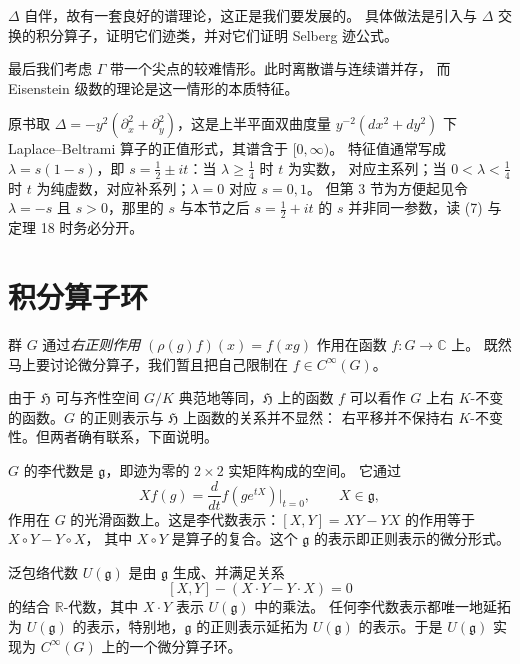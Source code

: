 $\Delta$ 自伴，故有一套良好的谱理论，这正是我们要发展的。
具体做法是引入与 $\Delta$ 交换的积分算子，证明它们迹类，并对它们证明 Selberg 迹公式。

最后我们考虑 $\Gamma$ 带一个尖点的较难情形。此时离散谱与连续谱并存，
而 Eisenstein 级数的理论是这一情形的本质特征。

\begin{annote}
原书取 $\Delta=-y^{2}(\partial_{x}^{2}+\partial_{y}^{2})$，这是上半平面双曲度量
$y^{-2}(dx^{2}+dy^{2})$ 下 Laplace--Beltrami 算子的正值形式，其谱含于 $[0,\infty)$。
特征值通常写成 $\lambda=s(1-s)$，即 $s=\tfrac12\pm it$：当 $\lambda\ge\tfrac14$ 时 $t$ 为实数，
对应主系列；当 $0<\lambda<\tfrac14$ 时 $t$ 为纯虚数，对应补系列；$\lambda=0$ 对应 $s=0,1$。
但第 3 节为方便起见令 $\lambda=-s$ 且 $s>0$，那里的 $s$ 与本节之后 $s=\tfrac12+it$ 的 $s$
并非同一参数，读 (7) 与定理 18 时务必分开。
\par{}
\end{annote}

\section{积分算子环}

群 $G$ 通过\emph{右正则作用} $(\rho(g)f)(x)=f(xg)$ 作用在函数 $f:G\to\mathbb{C}$ 上。
既然马上要讨论微分算子，我们暂且把自己限制在 $f\in C^{\infty}(G)$。

由于 $\mathfrak{H}$ 可与齐性空间 $G/K$ 典范地等同，$\mathfrak{H}$ 上的函数 $f$ 可以看作 $G$
上右 $K$-不变的函数。$G$ 的正则表示与 $\mathfrak{H}$ 上函数的关系并不显然：
右平移并不保持右 $K$-不变性。但两者确有联系，下面说明。

$G$ 的李代数是 $\mathfrak{g}$，即迹为零的 $2\times2$ 实矩阵构成的空间。
它通过
\[
Xf(g)=\frac{d}{dt}f(ge^{tX})\Big|_{t=0},\qquad X\in\mathfrak{g},
\]
作用在 $G$ 的光滑函数上。这是李代数表示：$[X,Y]=XY-YX$ 的作用等于 $X\circ Y-Y\circ X$，
其中 $X\circ Y$ 是算子的复合。这个 $\mathfrak{g}$ 的表示即正则表示的微分形式。

泛包络代数 $U(\mathfrak{g})$ 是由 $\mathfrak{g}$ 生成、并满足关系
\[
[X,Y]-(X\cdot Y-Y\cdot X)=0
\]
的结合 $\mathbb{R}$-代数，其中 $X\cdot Y$ 表示 $U(\mathfrak{g})$ 中的乘法。
任何李代数表示都唯一地延拓为 $U(\mathfrak{g})$ 的表示，特别地，$\mathfrak{g}$ 的正则表示延拓为
$U(\mathfrak{g})$ 的表示。于是 $U(\mathfrak{g})$ 实现为 $C^{\infty}(G)$ 上的一个微分算子环。

